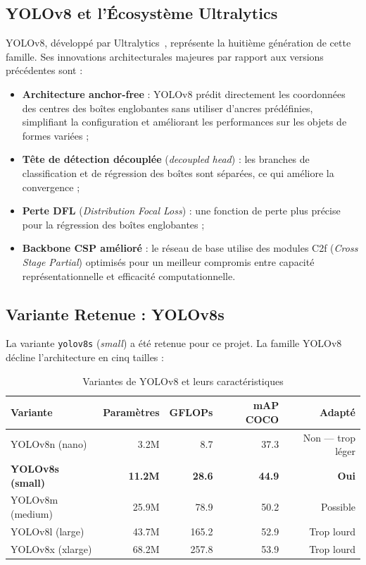 \documentclass{rapportENSIAS}
\begin{document}
\subsection{YOLOv8 et l'Écosystème Ultralytics}

YOLOv8, développé par Ultralytics~\cite{jocher2023ultralytics}, représente la
huitième génération de cette famille. Ses innovations architecturales majeures
par rapport aux versions précédentes sont :

\begin{itemize}
    \item \textbf{Architecture anchor-free} : YOLOv8 prédit directement les
          coordonnées des centres des boîtes englobantes sans utiliser d'ancres
          prédéfinies, simplifiant la configuration et améliorant les performances
          sur les objets de formes variées ;
    \item \textbf{Tête de détection découplée} (\textit{decoupled head}) :
          les branches de classification et de régression des boîtes sont
          séparées, ce qui améliore la convergence ;
    \item \textbf{Perte DFL} (\textit{Distribution Focal Loss}) : une fonction
          de perte plus précise pour la régression des boîtes englobantes ;
    \item \textbf{Backbone CSP amélioré} : le réseau de base utilise des
          modules C2f (\textit{Cross Stage Partial}) optimisés pour un meilleur
          compromis entre capacité représentationnelle et efficacité computationnelle.
\end{itemize}

\subsection{Variante Retenue : YOLOv8s}

La variante \texttt{yolov8s} (\textit{small}) a été retenue pour ce projet.
La famille YOLOv8 décline l'architecture en cinq tailles :

\begin{table}[H]
\centering
\caption{Variantes de YOLOv8 et leurs caractéristiques}
\label{tab:yolov8_variants}
\begin{tabular}{lrrrr}
\toprule
\textbf{Variante} & \textbf{Paramètres} & \textbf{GFLOPs} & \textbf{mAP COCO} & \textbf{Adapté} \\
\midrule
YOLOv8n (nano)   & 3.2M  & 8.7   & 37.3 & Non — trop léger \\
\textbf{YOLOv8s (small)}  & \textbf{11.2M} & \textbf{28.6} & \textbf{44.9} & \textbf{Oui} \\
YOLOv8m (medium) & 25.9M & 78.9  & 50.2 & Possible \\
YOLOv8l (large)  & 43.7M & 165.2 & 52.9 & Trop lourd \\
YOLOv8x (xlarge) & 68.2M & 257.8 & 53.9 & Trop lourd \\
\bottomrule
\end{tabular}
\end{table}
\end{document}

